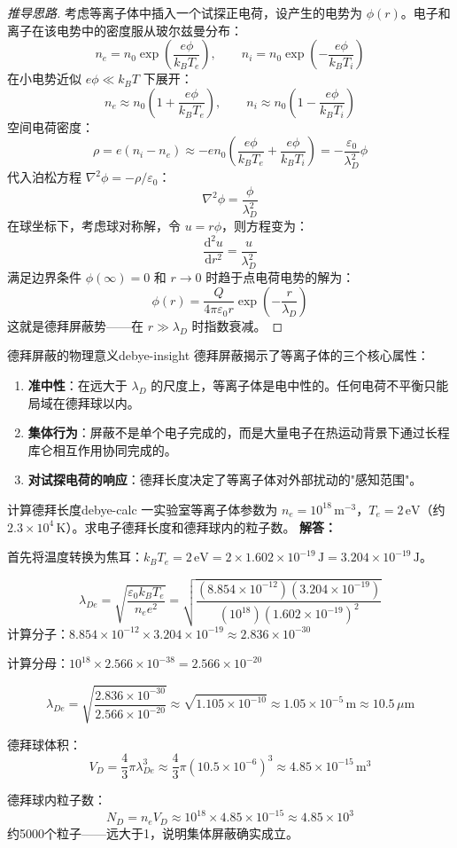 \documentclass[12pt,a4paper,openany,oneside]{book}
\newcommand{\diff}{\mathrm{d}}
\newcommand{\eps}{\varepsilon}
\newcommand{\lap}{\nabla^2}
\newcommand{\difficulty}[1]{\marginnote{\textcolor{red}{\textbf{[#1]}}}}
\begin{document}
\begin{proof}[推导思路]
考虑等离子体中插入一个试探正电荷，设产生的电势为 $\phi(r)$。电子和离子在该电势中的密度服从玻尔兹曼分布：
\[
n_e = n_0 \exp\left(\frac{e\phi}{k_B T_e}\right), \qquad n_i = n_0 \exp\left(-\frac{e\phi}{k_B T_i}\right)
\]
在小电势近似 $e\phi \ll k_B T$ 下展开：
\[
n_e \approx n_0\left(1 + \frac{e\phi}{k_B T_e}\right), \qquad n_i \approx n_0\left(1 - \frac{e\phi}{k_B T_i}\right)
\]
空间电荷密度：
\[
\rho = e(n_i - n_e) \approx -en_0\left(\frac{e\phi}{k_B T_e} + \frac{e\phi}{k_B T_i}\right) = -\frac{\eps_0}{\lambda_D^2}\phi
\]
代入泊松方程 $\lap\phi = -\rho/\eps_0$：
\[
\lap\phi = \frac{\phi}{\lambda_D^2}
\]
在球坐标下，考虑球对称解，令 $u=r\phi$，则方程变为：
\[
\frac{\diff^2 u}{\diff r^2} = \frac{u}{\lambda_D^2}
\]
满足边界条件 $\phi(\infty)=0$ 和 $r\to 0$ 时趋于点电荷电势的解为：
\[
\phi(r) = \frac{Q}{4\pi\eps_0 r} \exp\left(-\frac{r}{\lambda_D}\right)
\]
这就是德拜屏蔽势——在 $r \gg \lambda_D$ 时指数衰减。
\end{proof}

\begin{insight}{德拜屏蔽的物理意义}{debye-insight}
德拜屏蔽揭示了等离子体的三个核心属性：
\begin{enumerate}
\item \textbf{准中性}：在远大于 $\lambda_D$ 的尺度上，等离子体是电中性的。任何电荷不平衡只能局域在德拜球以内。
\item \textbf{集体行为}：屏蔽不是单个电子完成的，而是大量电子在热运动背景下通过长程库仑相互作用协同完成的。
\item \textbf{对试探电荷的响应}：德拜长度决定了等离子体对外部扰动的"感知范围"。
\end{enumerate}
\end{insight}

\begin{example}{计算德拜长度}{debye-calc}
\difficulty{基础}
一实验室等离子体参数为 $n_e = 10^{18}\,\mathrm{m}^{-3}$，$T_e = 2\,\mathrm{eV}$（约 $2.3\times 10^4\,\mathrm{K}$）。求电子德拜长度和德拜球内的粒子数。
\tcblower
\textbf{解答：}

首先将温度转换为焦耳：$k_B T_e = 2\,\mathrm{eV} = 2 \times 1.602\times 10^{-19}\,\mathrm{J} = 3.204\times 10^{-19}\,\mathrm{J}$。

\[
\lambda_{De} = \sqrt{\frac{\eps_0 k_B T_e}{n_e e^2}} = \sqrt{\frac{(8.854\times 10^{-12})(3.204\times 10^{-19})}{(10^{18})(1.602\times 10^{-19})^2}}
\]
计算分子：$8.854\times 10^{-12} \times 3.204\times 10^{-19} \approx 2.836\times 10^{-30}$

计算分母：$10^{18} \times 2.566\times 10^{-38} = 2.566\times 10^{-20}$

\[
\lambda_{De} = \sqrt{\frac{2.836\times 10^{-30}}{2.566\times 10^{-20}}} \approx \sqrt{1.105\times 10^{-10}} \approx 1.05\times 10^{-5}\,\mathrm{m} \approx 10.5\,\mu\mathrm{m}
\]

德拜球体积：
\[
V_D = \frac{4}{3}\pi \lambda_{De}^3 \approx \frac{4}{3}\pi (10.5\times 10^{-6})^3 \approx 4.85\times 10^{-15}\,\mathrm{m}^3
\]

德拜球内粒子数：
\[
N_D = n_e V_D \approx 10^{18} \times 4.85\times 10^{-15} \approx 4.85\times 10^{3}
\]
约5000个粒子——远大于1，说明集体屏蔽确实成立。
\end{example}
\end{document}
